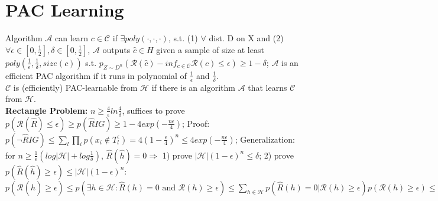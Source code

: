 \section{PAC Learning}
Algorithm $\mathcal{A}$ can learn $c \in \mathcal{C}$ if $\exists poly(\cdot,\cdot,\cdot)$, s.t. (1) $\forall$ dist. D on X and (2) $\forall \epsilon \in [0,\frac{1}{2}], \delta \in [0,\frac{1}{2}]$, $\mathcal{A}$ outputs $\hat{c} \in H$ given a sample of size at least $poly(\frac{1}{\epsilon},\frac{1}{\delta}, size(c))$ s.t. $p_{Z\sim D^n}(\mathcal{R}(\hat{c}) - inf_{c\in \mathcal{C}}\mathcal{R}(c) \leq \epsilon) \geq 1 - \delta$; $\mathcal{A}$ is an efficient PAC algorithm if it runs in polynomial of $\frac{1}{\epsilon}$ and $\frac{1}{\delta}$. \\
$\mathcal{C}$ is (efficiently) PAC-learnable from $\mathcal{H}$ if there is an algorithm $\mathcal{A}$ that learns
$\mathcal{C}$ from $\mathcal{H}$. \\
\textbf{Rectangle Problem: } $n \geq \frac{4}{\epsilon}ln\frac{4}{\delta}$, suffices to prove $p(\mathcal{R}(\hat{R})\leq \epsilon) \geq p(\hat{R}IG) \geq 1-4exp(-\frac{n\epsilon}{4})$; Proof: $p(\text{¬} \hat{R}IG)\leq \sum_l \prod_i p(x_i \notin T_{l}^{\epsilon}) = 4(1-\frac{\epsilon}{4})^n \leq 4exp(-\frac{n\epsilon}{4})$; Generalization: for $n \geq \frac{1}{\epsilon}(log|\mathcal{H}|+log\frac{1}{\delta})$, $\hat{R}(\hat{h}) = 0 \Rightarrow$ 1) prove $|\mathcal{H}|(1-\epsilon)^n \leq \delta$; 2) prove $p(\hat{R}(\hat{h}) \geq \epsilon) \leq |\mathcal{H}|(1-\epsilon)^n$: $p(\mathcal{R}(\hat{h}) \geq \epsilon) \leq p(\exists h \in \mathcal{H}: \hat{R}(h) = 0 \text{ and } \mathcal{R}(h) \geq \epsilon) \leq \sum_{h\in \mathcal{H}} p(\hat{R}(h) = 0 | \mathcal{R}(h) \geq \epsilon) p(\mathcal{R}(h) \geq \epsilon) \leq \sum_{h} p(\hat{R}(h) = 0 | \mathcal{R}(h) \geq \epsilon) \leq \sum_{h} (1-\epsilon)^n$

